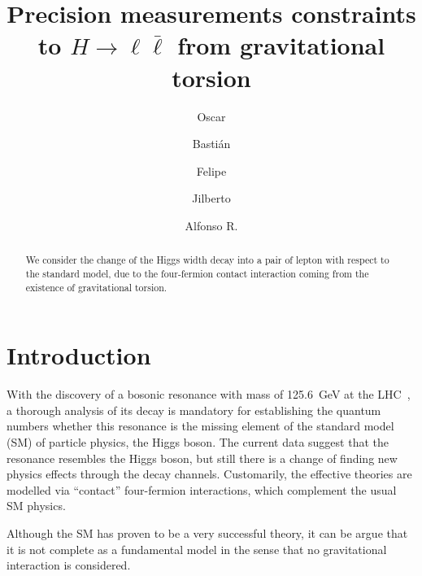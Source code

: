 \documentclass[twocolumn,aps,prd,showkeys,showpacs,groupedaddress]{revtex4-1}
\begin{document}
\title{Precision measurements constraints to $H \to \ell \bar{\ell}$ from gravitational torsion}

\author{Oscar }
\author{Basti\'an }
\author{Felipe }
\author{Jilberto }
\author{Alfonso R. }



\affiliation{\UTFSM,}

\begin{abstract}
  We consider the change of the Higgs width decay into a pair of lepton with respect to the standard model, due to the four-fermion contact interaction coming from the existence of gravitational torsion.
\end{abstract}



\maketitle

\section{\label{intro}Introduction}

With the discovery of a bosonic resonance with mass of  \SI{125.6}{\GeV} at the LHC~\cite{Aaltonen:2012qt,Aad:2012tfa,Chatrchyan:2012ufa}, a thorough  analysis of its decay is mandatory for establishing the quantum numbers whether this resonance is the missing element of the standard model (SM) of particle physics, the Higgs boson. The current data suggest that the resonance resembles the Higgs boson, but still there is a change of finding new physics effects through the decay channels. Customarily, the effective theories are modelled via ``contact'' four-fermion interactions, which complement the usual SM physics.

Although the SM has proven to be a very successful theory, it can be argue that it is not  complete as a fundamental model in the sense that no gravitational interaction is considered.
\end{document}
